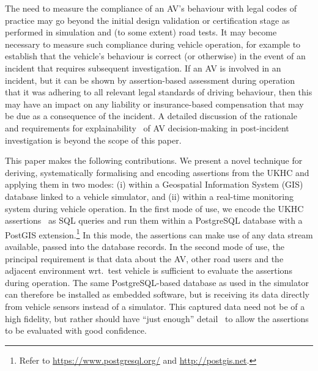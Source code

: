 The need to measure the compliance of an AV's behaviour with legal codes of practice may go beyond the initial design validation or certification stage as performed in simulation and (to some extent) road tests. It may become necessary to measure such compliance during vehicle operation, for example to establish that the vehicle's behaviour is correct (or otherwise) in the event of an incident that requires subsequent investigation. If an AV is involved in an incident, but it can be shown by assertion-based assessment during operation that it was adhering to all relevant legal standards of driving behaviour, then this may have an impact on any liability or insurance-based compensation that may be due as a consequence of the incident. A detailed discussion of the rationale and requirements for explainability~\cite{rosenfeld2019explainability} of AV decision-making in post-incident investigation is beyond the scope of this paper.



This paper makes the following contributions. We present a novel technique for deriving, systematically formalising and encoding assertions from the UKHC and applying them in two modes: (i) within a Geospatial Information System (GIS) database linked to a vehicle simulator, and (ii) within a real-time monitoring system during vehicle operation.
%
In the first mode of use, we encode the UKHC assertions~\cite{highwayCode} as SQL queries and run them within a PostgreSQL database with a PostGIS extension.\footnote{Refer to \url{https://www.postgresql.org/} and \url{http://postgis.net}.} In this mode, the assertions can make use of any data stream available, passed into the database records.
%
In the second mode of use, the principal requirement is that data about the AV, other road users and the adjacent environment wrt.\ test vehicle is sufficient to evaluate the assertions during operation. The same PostgreSQL-based database as used in the simulator can therefore be installed as embedded software, but is receiving its data directly from vehicle sensors instead of a simulator. This captured data need not be of a high fidelity, but rather should have ``just enough'' detail~\cite{Koopman2018} to allow the assertions to be evaluated with good confidence.





